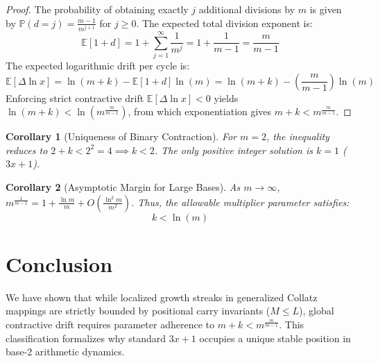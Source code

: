 \documentclass[11pt,a4paper]{article}
\theoremstyle{plain}
\newtheorem{corollary}{Corollary}
\theoremstyle{definition}
\begin{document}
\begin{proof}
The probability of obtaining exactly $j$ additional divisions by $m$ is given by $\mathbb{P}(d = j) = \frac{m-1}{m^{j+1}}$ for $j \ge 0$. The expected total division exponent is:
\begin{equation}
\mathbb{E}[1 + d] = 1 + \sum_{j=1}^{\infty} \frac{1}{m^j} = 1 + \frac{1}{m-1} = \frac{m}{m-1}
\end{equation}
The expected logarithmic drift per cycle is:
\begin{equation}
\mathbb{E}[\Delta \ln x] = \ln(m+k) - \mathbb{E}[1+d]\ln(m) = \ln(m+k) - \left(\frac{m}{m-1}\right)\ln(m)
\end{equation}
Enforcing strict contractive drift $\mathbb{E}[\Delta \ln x] < 0$ yields $\ln(m+k) < \ln\left(m^{\frac{m}{m-1}}\right)$, from which exponentiation gives $m + k < m^{\frac{m}{m-1}}$.
\end{proof}

\begin{corollary}[Uniqueness of Binary Contraction]
For $m = 2$, the inequality reduces to $2 + k < 2^2 = 4 \implies k < 2$. The only positive integer solution is $k = 1$ ($3x+1$).
\end{corollary}

\begin{corollary}[Asymptotic Margin for Large Bases]
As $m \to \infty$, $m^{\frac{1}{m-1}} = 1 + \frac{\ln m}{m} + O\left(\frac{\ln^2 m}{m^2}\right)$. Thus, the allowable multiplier parameter satisfies:
\begin{equation}
k < \ln(m)
\end{equation}
\end{corollary}

\section{Conclusion}
We have shown that while localized growth streaks in generalized Collatz mappings are strictly bounded by positional carry invariants ($M \le L$), global contractive drift requires parameter adherence to $m + k < m^{\frac{m}{m-1}}$. This classification formalizes why standard $3x+1$ occupies a unique stable position in base-2 arithmetic dynamics.
\end{document}
